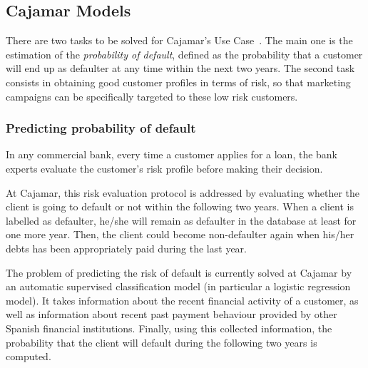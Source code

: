 
\newpage
\newpage
\newcommand{\X}{\mathbf{X}}
\newcommand{\Y}{\mathbf{Y}}
\newcommand{\Z}{\mathbf{Z}}
\newcommand{\x}{\mathbf{x}}
\newcommand{\y}{\mathbf{y}}
\newcommand{\z}{\mathbf{z}}
\newcommand{\argmax}[1]{\underset{#1}{\operatorname{arg}\,\operatorname{max}}\;}


\subsection{Cajamar Models}
\label{Section:CajaMarModels}

There are two tasks to be solved for Cajamar's Use Case~\cite{Fer14b}. The main one is the estimation of the \emph{probability of default}, defined as the probability that a customer will end up as defaulter at any time within the next two years. The second task consists in obtaining good customer profiles in terms of risk, so that marketing campaigns can be specifically targeted to these low risk customers. 

\subsubsection{Predicting probability of default} \label{SubSection:Predicting}

In any commercial bank, every time a customer applies for a loan, the bank experts evaluate the customer's risk profile before making their decision. 

At Cajamar, this risk evaluation protocol is addressed by evaluating whether the client is going to default or not within the following two years. When a client is labelled as defaulter, he/she will remain as defaulter in the database at least for one more year. Then, the client could become non-defaulter again when his/her debts has been appropriately paid during the last year. 

The problem of predicting the risk of default is currently solved at Cajamar by an automatic supervised classification model (in particular a logistic regression model). It takes information about the recent financial activity of a customer, as well as information about recent past payment behaviour provided by other Spanish financial institutions. Finally, using this collected information, the probability that the client will default during the following two years is computed. 


